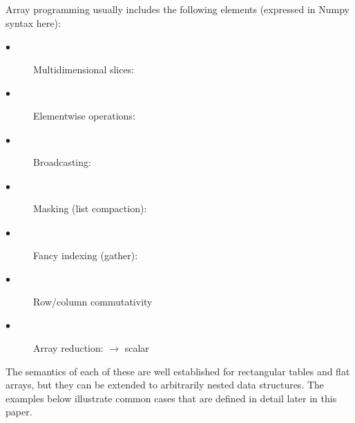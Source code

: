 \documentclass{webofc}
\begin{document}
Array programming usually includes the following elements (expressed in Numpy syntax here):

\begin{description}
\item[\hspace{1 cm}$\bullet$] Multidimensional slices: 
\item[\hspace{1 cm}$\bullet$] Elementwise operations: 
\item[\hspace{1 cm}$\bullet$] Broadcasting: 
\item[\hspace{1 cm}$\bullet$] Masking (list compaction): 
\item[\hspace{1 cm}$\bullet$] Fancy indexing (gather): 
\item[\hspace{1 cm}$\bullet$] Row/column commutativity 
\item[\hspace{1 cm}$\bullet$] Array reduction:  $\to$ scalar
\end{description}

\noindent The semantics of each of these are well established for rectangular tables and flat arrays, but they can be extended to arbitrarily nested data structures. The examples below illustrate common cases that are defined in detail later in this paper.
\end{document}

